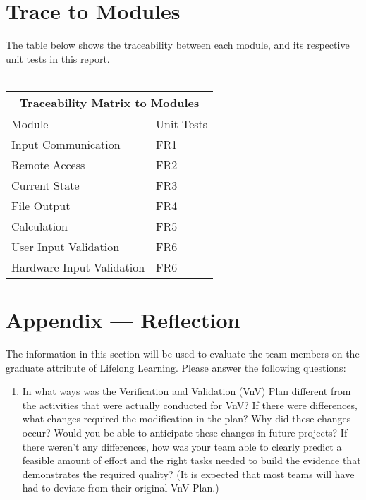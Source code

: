 \documentclass[12pt, titlepage]{article}
\begin{document}
\section{Trace to Modules}		
The table below shows the traceability between each module, and its respective unit tests in this report.\\
\\
\begin{tabular}{ |p{5cm}||p{5cm}| }
  \hline
  \multicolumn{2}{|c|}{Traceability Matrix to Modules} \\
  \hline
  Module & Unit Tests \\
  \hline
  Input Communication   & FR1   \\ \hline
  Remote Access   & FR2   \\ \hline
  Current State   & FR3   \\ \hline
  File Output   & FR4   \\ \hline
  Calculation   & FR5   \\ \hline
  User Input Validation  & FR6   \\ \hline
  Hardware Input Validation  & FR6  \\ \hline
  
 \end{tabular}


% 

\newpage{}
\section*{Appendix --- Reflection}

The information in this section will be used to evaluate the team members on the
graduate attribute of Lifelong Learning.  Please answer the following questions:

\begin{enumerate}
  \item In what ways was the Verification and Validation (VnV) Plan different
  from the activities that were actually conducted for VnV?  If there were
  differences, what changes required the modification in the plan?  Why did
  these changes occur?  Would you be able to anticipate these changes in future projects?  If there weren't any differences, how was your team able to clearly predict a feasible amount of effort and the right tasks needed to build the evidence that demonstrates the required quality?  (It is expected that most teams will have had to deviate from their original VnV Plan.)
\end{enumerate}
\end{document}
